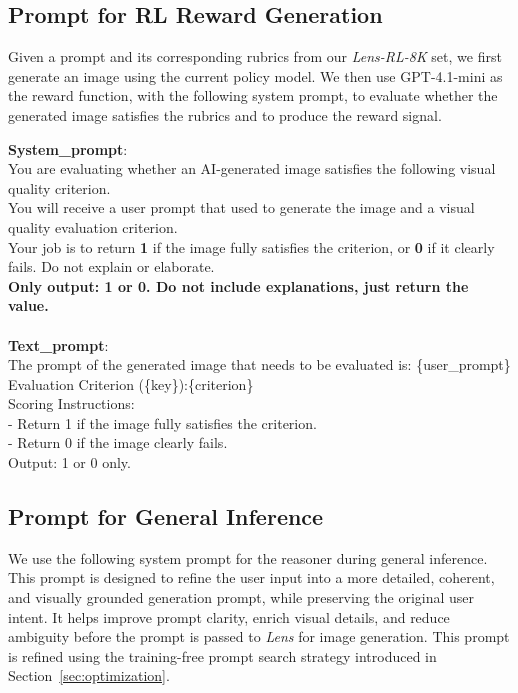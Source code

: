 \documentclass{llmxive}
\begin{document}
\subsection{Prompt for RL Reward Generation}
\label{sec:prompt-reward}
Given a prompt and its corresponding rubrics from our \textit{Lens-RL-8K} set, we first generate an image using the current policy model. We then use GPT-4.1-mini as the reward function, with the following system prompt, to evaluate whether the generated image satisfies the rubrics and to produce the reward signal.


\begin{tcolorbox}[
  breakable,
  enhanced,
  colback=white,
  colframe=black!70,
  boxrule=0.8pt,
  arc=2pt,
  title={Prompt for RL Reward Generation},
  colbacktitle=black!75,
  coltitle=white,
  fonttitle=\bfseries,
  left=8pt,right=8pt,top=8pt,bottom=8pt
]
\footnotesize
\textbf{System\_prompt}: \\
\indent You are evaluating whether an AI-generated image satisfies the following visual quality criterion.\\
\indent You will receive a user prompt that used to generate the image and a visual quality evaluation criterion.\\
\indent Your job is to return \textbf{1} if the image fully satisfies the criterion, or \textbf{0} if it clearly fails. Do not explain or elaborate.\\
\indent \textbf{Only output: 1 or 0. Do not include explanations, just return the value.}\\
\\
\textbf{Text\_prompt}:\\
\indent The prompt of the generated image that needs to be evaluated is: \{user\_prompt\}\\
\indent Evaluation Criterion (\{key\}):\{criterion\}\\
\indent Scoring Instructions:\\
\indent - Return 1 if the image fully satisfies the criterion.\\
\indent - Return 0 if the image clearly fails.\\
\indent Output: 1 or 0 only.
\end{tcolorbox}


\subsection{Prompt for General Inference}
\label{sec:prompt-general}
We use the following system prompt for the reasoner during general inference. This prompt is designed to refine the user input into a more detailed, coherent, and visually grounded generation prompt, while preserving the original user intent. It helps improve prompt clarity, enrich visual details, and reduce ambiguity before the prompt is passed to \textit{Lens} for image generation. This prompt is refined using the training-free prompt search strategy introduced in Section~\ref{sec:optimization}.
\end{document}
